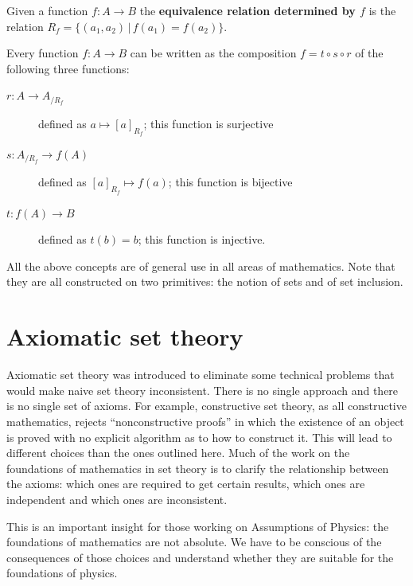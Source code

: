 \documentclass{article}
\begin{document}
\begin{defn}
	Given a function $f : A \to B$ the \textbf{equivalence relation determined by $f$} is the relation $R_f = \{ (a_1, a_2) \, | \, f(a_1) = f(a_2) \}$.
\end{defn}

\begin{prop}
	Every function $f : A \to B$ can be written as the composition $f = t \circ s \circ r$ of the following three functions:
	\begin{description}
		\item[$r : A \to A_{/R_f}$] defined as $a \mapsto [a]_{R_f}$; this function is surjective
		\item[$s : A_{/R_f} \to f(A)$] defined as $[a]_{R_f} \mapsto f(a)$; this function is bijective
		\item[$t : f(A) \to B$] defined as $t(b) = b$; this function is injective.
	\end{description}
\end{prop}

\begin{remark}
	All the above concepts are of general use in all areas of mathematics. Note that they are all constructed on two primitives: the notion of sets and of set inclusion.
\end{remark}

\section{Axiomatic set theory}

Axiomatic set theory was introduced to eliminate some technical problems that would make naive set theory inconsistent. There is no single approach and there is no single set of axioms. For example, constructive set theory, as all constructive mathematics, rejects ``nonconstructive proofs'' in which the existence of an object is proved with no explicit algorithm as to how to construct it. This will lead to different choices than the ones outlined here. Much of the work on the foundations of mathematics in set theory is to clarify the relationship between the axioms: which ones are required to get certain results, which ones are independent and which ones are inconsistent.

This is an important insight for those working on Assumptions of Physics: the foundations of mathematics are not absolute. We have to be conscious of the consequences of those choices and understand whether they are suitable for the foundations of physics.
\end{document}
